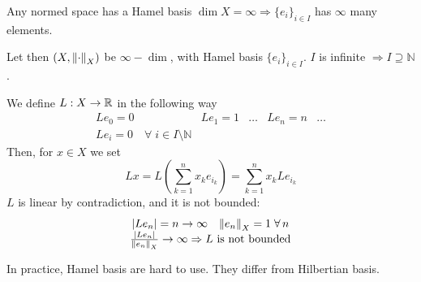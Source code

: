 Any normed space has a Hamel basis \(\dim X = \infty \Rightarrow \{e_i\}_{i \in I}\) has \(\infty\) many elements.

\noindent Let then \((X, \norm{\cdot}_X)\) be \(\infty -\dim\), with Hamel basis \(\{e_i \}_{i \in I}\). \(I\) is infinite \(\Rightarrow I \supseteq \mathbb{N}\).

\noindent We define \(L:X \to \mathbb{R}\) in the following way 
\[
    \begin{array}{ccccc}
        L e_0 = 0 & L e_1 = 1 & \dots & L e_n = n & \dots \\
        L e_i = 0 \quad \forall \; i \in I \setminus \mathbb{N} &&&&
    \end{array}
\]
Then, for \(x \in X\) we set
\[
    Lx = L \left( \sum_{k=1}^n x_k e_{i_k} \right) = \sum_{k=1}^n x_k L e_{i_k}
\]
\(L\) is linear by contradiction, and it is not bounded:
\[
    \begin{array}{c}
        \abs{L e_n} = n \to \infty \quad \norm{e_n }_X = 1 \; \forall\, n \\
        \frac{\abs{L e_n}}{\norm{e_n}_X} \to \infty \Rightarrow L \text{ is not bounded}
    \end{array}
\]
\begin{remark}
    In practice, Hamel basis are hard to use. They differ from Hilbertian basis.
\end{remark}

